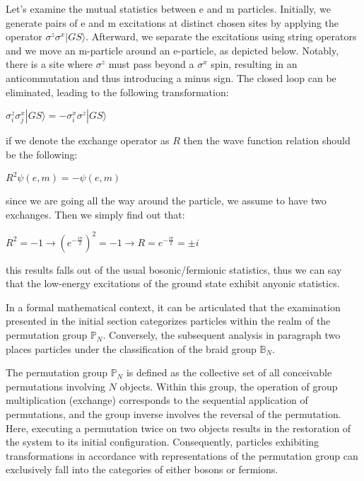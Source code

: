 \documentclass{Configuration_Files/PoliMi3i_thesis}
\begin{document}
Let's examine the mutual statistics between e and m particles. Initially, we generate pairs of e and m excitations at distinct chosen sites by applying the operator $\sigma^z\sigma^x|GS\rangle$. Afterward, we separate the excitations using string operators and we move an m-particle around an e-particle, as depicted below. Notably, there is a site where $\sigma^z$ must pass beyond a $\sigma^x$ spin, resulting in an anticommutation and thus introducing a minus sign. The closed loop can be eliminated, leading to the following transformation:

\begin{center}
	$\sigma_i^z\sigma_j^x|GS\rangle = - \sigma_i^x\sigma^z|GS\rangle$
\end{center}

if we denote the exchange operator as $R$ then the wave function relation should be the following:

\begin{center}
	$R^2\psi(e,m) = - \psi(e,m)$
\end{center}

since we are going all the way around the particle, we assume to have two exchanges. Then we simply find out that:

\begin{center}
	$R^2 = - 1 \rightarrow ( e^{-\frac{i\pi}{2}})^2 = - 1  \rightarrow R = e^{-\frac{i\pi}{2}} = \pm i $
\end{center}

this results falls out of the usual bosonic/fermionic statistics, thus we can say that the low-energy excitations of the ground state exhibit anyonic statistics.\newline



In a formal mathematical context, it can be articulated that the examination presented in the initial section categorizes particles within the realm of the permutation group $\mathbb{P}_N$. Conversely, the subsequent analysis in paragraph two places particles under the classification of the braid group $\mathbb{B}_N$. \newline

The permutation group $\mathbb{P}_N$ is defined as the collective set of all conceivable permutations involving $N$ objects. Within this group, the operation of group multiplication (exchange) corresponds to the sequential application of permutations, and the group inverse involves the reversal of the permutation.
Here, executing a permutation twice on two objects results in the restoration of the system to its initial configuration. Consequently, particles exhibiting transformations in accordance with representations of the permutation group can exclusively fall into the categories of either bosons or fermions. \newline
\end{document}
